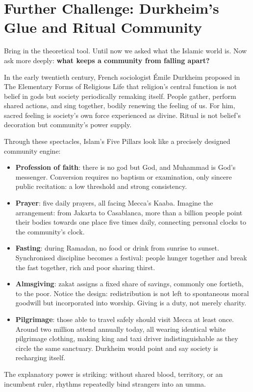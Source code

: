 \section[Further Challenge: Ritual Makes Community]{Further Challenge: Durkheim's Glue and Ritual Community}
Bring in the theoretical tool. Until now we asked what the Islamic world is. Now ask more deeply: \textbf{what keeps a community from falling apart?}

In the early twentieth century, French sociologist Émile Durkheim proposed in The Elementary Forms of Religious Life that religion's central function is not belief in gods but society periodically remaking itself. People gather, perform shared actions, and sing together, bodily renewing the feeling of us. For him, sacred feeling is society's own force experienced as divine. Ritual is not belief's decoration but community's power supply.

Through these spectacles, Islam's Five Pillars look like a precisely designed community engine:

\begin{itemize}
\item \textbf{Profession of faith}: there is no god but God, and Muhammad is God's messenger. Conversion requires no baptism or examination, only sincere public recitation: a low threshold and strong consistency.
\item \textbf{Prayer}: five daily prayers, all facing Mecca's Kaaba. Imagine the arrangement: from Jakarta to Casablanca, more than a billion people point their bodies towards one place five times daily, connecting personal clocks to the community's clock.
\item \textbf{Fasting}: during Ramadan, no food or drink from sunrise to sunset. Synchronised discipline becomes a festival: people hunger together and break the fast together, rich and poor sharing thirst.
\item \textbf{Almsgiving}: zakat assigns a fixed share of savings, commonly one fortieth, to the poor. Notice the design: redistribution is not left to spontaneous moral goodwill but incorporated into worship. Giving is a duty, not merely charity.
\item \textbf{Pilgrimage}: those able to travel safely should visit Mecca at least once. Around two million attend annually today, all wearing identical white pilgrimage clothing, making king and taxi driver indistinguishable as they circle the same sanctuary. Durkheim would point and say society is recharging itself.
\end{itemize}
The explanatory power is striking: without shared blood, territory, or an incumbent ruler, rhythms repeatedly bind strangers into an umma.

